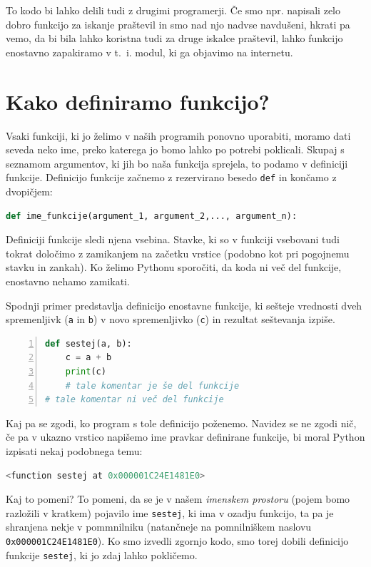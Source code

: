 To kodo bi lahko delili tudi z drugimi programerji. Če smo npr. napisali zelo dobro funkcijo za iskanje praštevil in smo nad njo nadvse navdušeni, hkrati pa vemo, da bi bila lahko koristna tudi za druge iskalce praštevil, lahko funkcijo enostavno zapakiramo v t.~i. modul, ki ga objavimo na internetu. 

\section{Kako definiramo funkcijo?}

Vsaki funkciji, ki jo želimo v naših programih ponovno uporabiti, moramo dati seveda neko ime, preko katerega jo bomo lahko po potrebi poklicali. Skupaj s seznamom argumentov, ki jih bo naša funkcija sprejela, to podamo v definiciji funkcije. Definicijo funkcije začnemo z rezervirano besedo \texttt{def} in končamo z dvopičjem:

\begin{lstlisting}[language=Python]
def ime_funkcije(argument_1, argument_2,..., argument_n):
\end{lstlisting}

Definiciji funkcije sledi njena vsebina. Stavke, ki so v funkciji vsebovani tudi tokrat določimo z zamikanjem na začetku vrstice (podobno kot pri pogojnemu stavku in zankah). Ko želimo Pythonu sporočiti, da koda ni več del funkcije, enostavno nehamo zamikati.

Spodnji primer predstavlja definicijo enostavne funkcije, ki sešteje vrednosti dveh spremenljivk (\texttt{a} in \texttt{b}) v novo spremenljivko (\texttt{c}) in rezultat seštevanja izpiše.
\begin{lstlisting}[language=Python,numbers=left]
def sestej(a, b):
    c = a + b
    print(c)
    # tale komentar je še del funkcije
# tale komentar ni več del funkcije
\end{lstlisting}

Kaj pa se zgodi, ko program s tole definicijo poženemo. Navidez se ne zgodi nič, če pa v ukazno vrstico napišemo ime pravkar definirane funkcije, bi moral Python izpisati nekaj podobnega temu:
\begin{lstlisting}[language=Python]
<function sestej at 0x000001C24E1481E0>
\end{lstlisting}
Kaj to pomeni? To pomeni, da se je v našem \emph{imenskem prostoru} (pojem bomo razložili v kratkem) pojavilo ime \texttt{sestej}, ki ima v ozadju funkcijo, ta pa je shranjena nekje v pommnilniku (natančneje na pomnilniškem naslovu \texttt{0x000001C24E1481E0}). Ko smo izvedli zgornjo kodo, smo torej dobili definicijo funkcije \texttt{sestej}, ki jo zdaj lahko pokličemo.

